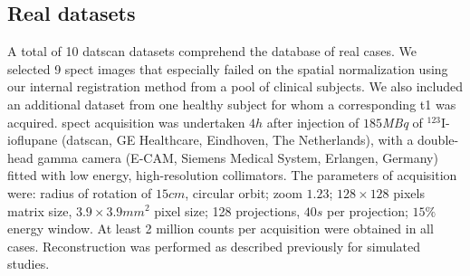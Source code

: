 \documentclass{frontiers}
\newcommand{\cbstart}{\relax}
\newcommand{\cbend}{\relax}
\begin{document}
\subsection{Real datasets} %
\label{sec:data_real}
\cbstart
A total of 10 \gls*{datscan} datasets comprehend the database of real cases.
We selected 9 \gls*{spect} images that especially failed on the spatial normalization
  using our internal registration method from a pool of clinical subjects.
We also included an additional dataset from one healthy subject for whom
  a corresponding \acrlong*{t1} was acquired.
\cbend
\Gls*{spect} acquisition was undertaken $4h$
  after injection  of $185$\textit{MBq} of $^{123}$I-ioflupane
  (\Gls*{datscan}, GE Healthcare, Eindhoven, The Netherlands),
  with a  double-head gamma camera (E-CAM, Siemens Medical System,
  Erlangen, Germany) fitted with low energy, high-resolution collimators.
The parameters of acquisition were: radius of rotation of $15cm$,
  circular orbit; zoom $1.23$; $128\times128$
  pixels matrix size, $3.9\times3.9mm^{2}$ pixel size;
  128 projections, $40s$ per projection; 
  $15\%$ energy window.
At least 2 million counts per acquisition were obtained in all cases.
Reconstruction was performed as described previously for simulated studies.
\end{document}

